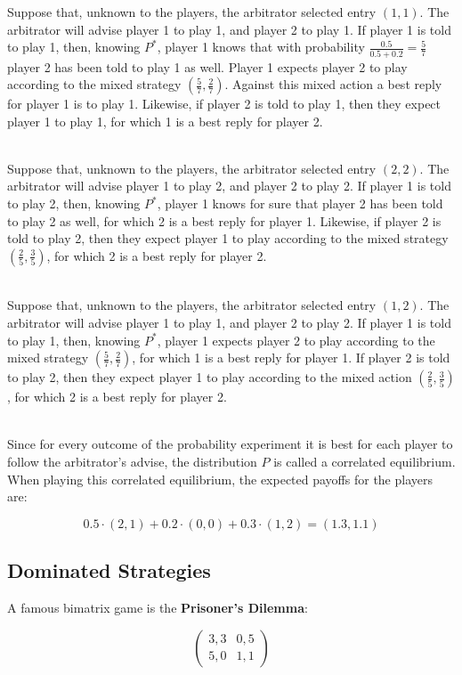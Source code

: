 \documentclass[12pt]{article}
\begin{document}
\noindent
Suppose that, unknown to the players, the arbitrator selected entry $(1, 1)$.
The arbitrator will advise player 1 to play 1, and player 2 to play 1.
If player 1 is told to play 1, then, knowing $P^*$, player 1 knows that with probability $\frac{0.5}{0.5 + 0.2} = \frac{5}{7}$ player 2 has been told to play 1 as well.
Player 1 expects player 2 to play according to the mixed strategy $(\frac{5}{7}, \frac{2}{7})$.
Against this mixed action a best reply for player 1 is to play 1.
Likewise, if player 2 is told to play 1, then they expect player 1 to play 1, for which 1 is a best reply for player 2.

\noindent
\\
Suppose that, unknown to the players, the arbitrator selected entry $(2, 2)$.
The arbitrator will advise player 1 to play 2, and player 2 to play 2.
If player 1 is told to play 2, then, knowing $P^*$, player 1 knows for sure that player 2 has been told to play 2 as well, for which 2 is a best reply for player 1.
Likewise, if player 2 is told to play 2, then they expect player 1 to play according to the mixed strategy $(\frac{2}{5}, \frac{3}{5})$, for which 2 is a best reply for player 2.

\noindent
\\
Suppose that, unknown to the players, the arbitrator selected entry $(1, 2)$.
The arbitrator will advise player 1 to play 1, and player 2 to play 2.
If player 1 is told to play 1, then, knowing $P^*$, player 1 expects player 2 to play according to the mixed strategy $(\frac{5}{7}, \frac{2}{7})$, for which 1 is a best reply for player 1.
If player 2 is told to play 2, then they expect player 1 to play according to the mixed action $(\frac{2}{5}, \frac{3}{5})$, for which 2 is a best reply for player 2.

\noindent
\\
Since for every outcome of the probability experiment it is best for each player to follow the arbitrator's advise, the distribution $P$ is called a correlated equilibrium.
When playing this correlated equilibrium, the expected payoffs for the players are:

\[ 0.5 \cdot (2, 1) + 0.2 \cdot (0, 0) + 0.3 \cdot (1, 2) = (1.3, 1.1) \]

\subsection{Dominated Strategies}
A famous bimatrix game is the \textbf{Prisoner's Dilemma}:

\[ \begin{pmatrix}
    3,3 & 0,5 \\
    5,0 & 1,1
\end{pmatrix} \]
\end{document}
